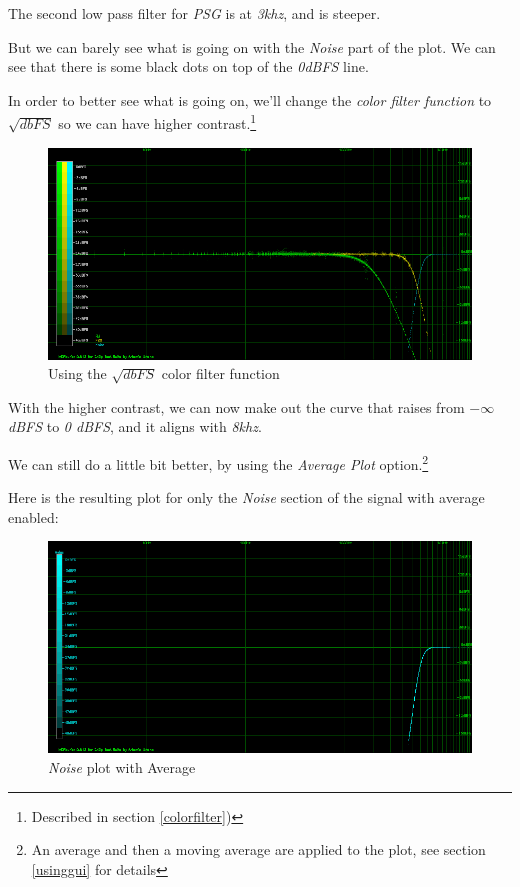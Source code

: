 \documentclass[10pt,a4paper]{report}
\begin{document}
The second low pass filter for \textit{PSG} is at \textit{3khz}, and is steeper.

But we can barely see what is going on with the \textit{Noise} part of the plot. We can see that there is some black dots on top of the \textit{0dBFS} line.

In order to better see what is going on, we'll change the \textit{color filter function} to $\sqrt{dbFS}$ so we can have higher contrast.\footnote{Described in section \ref{colorfilter})}

\begin{figure}[H]
	\centering
	\includegraphics[width=1.0\linewidth]{plots/Plot4-2-All-sqrt.png}
	\caption[Using SQRT]{Using the $\sqrt{dbFS}$ color filter function}
	\label{fig:plot4-2-all-sqrt}
\end{figure}

With the higher contrast, we can now make out the curve that raises from \textit{$-\infty$ dBFS} to \textit{0 dBFS}, and it aligns with \textit{8khz}.

We can still do a little bit better, by using the \textit{Average Plot} option.\footnote{An average and then a moving average are applied to the plot, see section \ref{usinggui} for details}

Here is the resulting plot for only the \textit{Noise} section of the signal with average enabled:

\begin{figure}[H]
	\centering
	\includegraphics[width=1.0\linewidth]{plots/Plot4-3-AVG-Noise.png}
	\caption[Noise Average]{\textit{Noise} plot with Average}
	\label{fig:plot4-3-avg-noise}
\end{figure}
\end{document}
